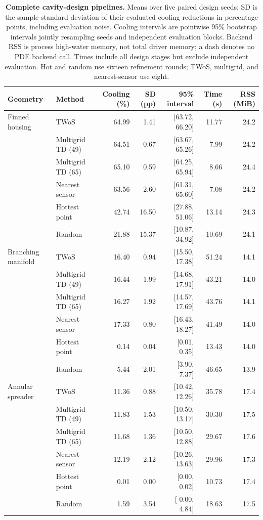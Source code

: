 \begin{table}[t]
\centering\small
\caption{\textbf{Complete cavity-design pipelines.} Means over five paired design seeds; SD is the sample standard deviation of their evaluated cooling reductions in percentage points, including evaluation noise. Cooling intervals are pointwise 95\% bootstrap intervals jointly resampling seeds and independent evaluation blocks. Backend RSS is process high-water memory, not total driver memory; a dash denotes no PDE backend call. Times include all design stages but exclude independent evaluation. Hot and random use sixteen refinement rounds; TWoS, multigrid, and nearest-sensor use eight.}
\label{tab:submissionpipeline}
\begin{tabular}{llrrrrr}
\toprule
Geometry & Method & Cooling (\%) & SD (pp) & 95\% interval & Time (s) & RSS (MiB) \\
\midrule
Finned housing & TWoS & 64.99 & 1.41 & [63.72, 66.20] & 11.77 & 24.2 \\
 & Multigrid TD (49) & 64.51 & 0.67 & [63.67, 65.26] & 7.99 & 24.2 \\
 & Multigrid TD (65) & 65.10 & 0.59 & [64.25, 65.94] & 8.66 & 24.4 \\
 & Nearest sensor & 63.56 & 2.60 & [61.31, 65.60] & 7.08 & 24.2 \\
 & Hottest point & 42.74 & 16.50 & [27.88, 51.06] & 13.14 & 24.3 \\
 & Random & 21.88 & 15.37 & [10.87, 34.92] & 10.69 & 24.1 \\
\midrule
Branching manifold & TWoS & 16.40 & 0.94 & [15.50, 17.38] & 51.24 & 14.1 \\
 & Multigrid TD (49) & 16.44 & 1.99 & [14.68, 17.91] & 43.21 & 14.0 \\
 & Multigrid TD (65) & 16.27 & 1.92 & [14.57, 17.69] & 43.76 & 14.1 \\
 & Nearest sensor & 17.33 & 0.80 & [16.43, 18.27] & 41.49 & 14.0 \\
 & Hottest point & 0.14 & 0.04 & [0.01, 0.35] & 13.43 & 14.0 \\
 & Random & 5.44 & 2.01 & [3.90, 7.37] & 46.65 & 13.9 \\
\midrule
Annular spreader & TWoS & 11.36 & 0.88 & [10.42, 12.26] & 35.78 & 17.4 \\
 & Multigrid TD (49) & 11.83 & 1.53 & [10.50, 13.17] & 30.30 & 17.5 \\
 & Multigrid TD (65) & 11.68 & 1.36 & [10.50, 12.88] & 29.67 & 17.6 \\
 & Nearest sensor & 12.19 & 2.12 & [10.26, 13.63] & 29.96 & 17.3 \\
 & Hottest point & 0.01 & 0.00 & [0.00, 0.02] & 10.73 & 17.4 \\
 & Random & 1.59 & 3.54 & [-0.00, 4.84] & 18.63 & 17.5 \\
\bottomrule
\end{tabular}
\end{table}

